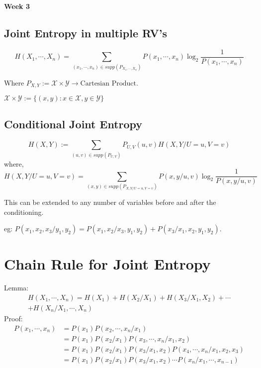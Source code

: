 \documentclass{article}
\begin{document}
\begin{center}
\textbf{\huge{Week 3}}
\end{center}
\subsection{Joint Entropy in multiple RV's}

$$H(X_1, \cdots, X_n)= \sum_{ (x_1, \cdots, x_n) \in supp(P_{X_1, \cdots, X_n})} P(x_1, \cdots, x_n) \log_2 \frac{1}{P(x_1, \cdots, x_n)}$$

Where $P_{X,Y} := \mathcal{X} \times \mathcal{Y} \rightarrow \text{Cartesian Product}$.

$\mathcal{X} \times \mathcal{Y} := \{ (x,y): x \in \mathcal{X}, y\in \mathcal{Y}\} $

\subsection{Conditional Joint Entropy}
$$H(X,Y):= \sum_{(u,v) \in supp(P_{U,V})} P_{U,V}(u,v)H(X,Y/U=u,V=v) $$
where,
$$ H(X,Y/U=u,V=v) = \sum_{(x,y) \in supp(P_{X,Y/U=u,V=v})} P(x,y/u,v) \log_2 \frac{1}{P(x,y/u,v)}$$

This can be extended to any number of variables before and after the conditioning.

eg: $P(x_1,x_2,x_3/y_1,y_2)= P(x_1,x_2/x_3,y_1,y_2)+ P(x_3/x_1,x_2,y_1,y_2)$.
\section{Chain Rule for Joint Entropy}

Lemma:
\begin{multline}
    H(X_1, \cdots, X_n)= H(X_1)+ H(X_2 / X_1)+ H(X_3/ X_1, X_2)+ \cdots \\ + H(X_n/ X_1, \cdots, X_n)
\end{multline}
Proof:
\begin{align*}
    P(x_1,\cdots,x_n)&=P(x_1)P(x_2,\cdots,x_n/x_1) \\
    &= P(x_1)P(x_2/x_1)P(x_3,\cdots,x_n/x_1,x_2) \\
    &= P(x_1)P(x_2/x_1)P(x_3/x_1,x_2)P(x_4,\cdots,x_n/x_1,x_2,x_3) \\
    &= P(x_1)P(x_2/x_1)P(x_3/x_1,x_2)\cdots P(x_n/x_1,\cdots,x_{n-1})
\end{align*}
\end{document}
